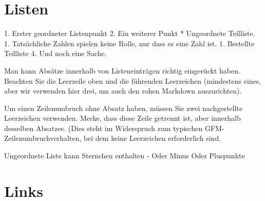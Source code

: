 \documentclass[
  12pt,
  nswissgerman,
  twoside,
  openright]{report}
\newenvironment{Shaded}{\begin{snugshade}}{\end{snugshade}}
\newcommand{\NormalTok}[1]{#1}
\newcommand{\StringTok}[1]{\textcolor[rgb]{0.31,0.60,0.02}{#1}}
\begin{document}
\hypertarget{listen}{%
\section{Listen}\label{listen}}

\begin{Shaded}
\begin{Highlighting}[]
\StringTok{1. Erster geordneter Listenpunkt}
\StringTok{2. Ein weiterer Punkt}
\StringTok{  * Ungeordnete Teilliste.}
\StringTok{1. Tatsächliche Zahlen spielen keine Rolle, nur dass es eine Zahl ist.}
\StringTok{  1. Bestellte Teilliste}
\StringTok{4. Und noch eine Sache.}

\NormalTok{   Man kann Absätze innerhalb von Listeneinträgen richtig eingerückt haben. Beachten Sie die Leerzeile oben und die führenden Leerzeichen (mindestens eines, aber wir verwenden hier drei, um auch den rohen Markdown auszurichten).}

\NormalTok{   Um einen Zeilenumbruch ohne Absatz haben, müssen Sie zwei nachgestellte Leerzeichen verwenden.}
\NormalTok{   Merke, dass diese Zeile getrennt ist, aber innerhalb desselben Absatzes.}
\NormalTok{   (Dies steht im Widerspruch zum typischen GFM{-}Zeilenumbruchverhalten, bei dem keine Leerzeichen erforderlich sind.}

\NormalTok{Ungeordnete Liste kann Sternchen enthalten}
\StringTok{{-} Oder Minus}
\StringTok{Oder Pluspunkte}
\end{Highlighting}
\end{Shaded}

\hypertarget{links}{%
\section{Links}\label{links}}
\end{document}
